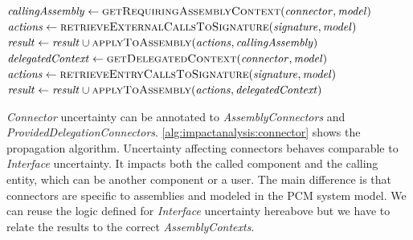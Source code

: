 \begin{algorithm}
\begin{algorithmic}[1]
             \label{alg:impactanalysis:connector:11}
                    \State $\mathit{callingAssembly} \gets \textsc{getRequiringAssemblyContext}(\mathit{connector}, \mathit{model})$ \label{alg:impactanalysis:connector:13}
                    \algblockskip
                       \label{alg:impactanalysis:connector:14}
                        \State $\mathit{actions} \gets \textsc{retrieveExternalCallsToSignature}(\mathit{signature}, \mathit{model})$
                        \State $\mathit{result} \gets \mathit{result} \cup \textsc{applyToAssembly}(\mathit{actions},\mathit{callingAssembly})$ \label{alg:impactanalysis:connector:16}
                    \EndFor
                    \algblockskip
                \EndCase
                    \State $\mathit{delegatedContext} \gets \textsc{getDelegatedContext}(\mathit{connector}, \mathit{model})$ \label{alg:impactanalysis:connector:19}
                    \algblockskip
                       \label{alg:impactanalysis:connector:20}
                        \State $\mathit{actions} \gets \textsc{retrieveEntryCallsToSignature}(\mathit{signature}, \mathit{model})$
                        \State $\mathit{result} \gets \mathit{result} \cup \textsc{applyToAssembly}(\mathit{actions},\mathit{delegatedContext})$ \label{alg:impactanalysis:connector:22}
                    \EndFor
                    \algblockskip
                \EndCase
            \EndSwitch
            \algblockskip

            \State {}
            \algindentskip
        \EndProcedure   
    \end{algorithmic}
\end{algorithm}

\emph{Connector} uncertainty can be annotated to \emph{AssemblyConnectors} and \emph{ProvidedDelegationConnectors}.
\autoref{alg:impactanalysis:connector} shows the propagation algorithm.
Uncertainty affecting connectors behaves comparable to \emph{Interface} uncertainty.
It impacts both the called component and the calling entity, which can be another component or a user.
The main difference is that connectors are specific to assemblies and modeled in the \ac{PCM} system model.
We can reuse the logic defined for \emph{Interface} uncertainty hereabove but we have to relate the results to the correct \emph{AssemblyContexts}.

